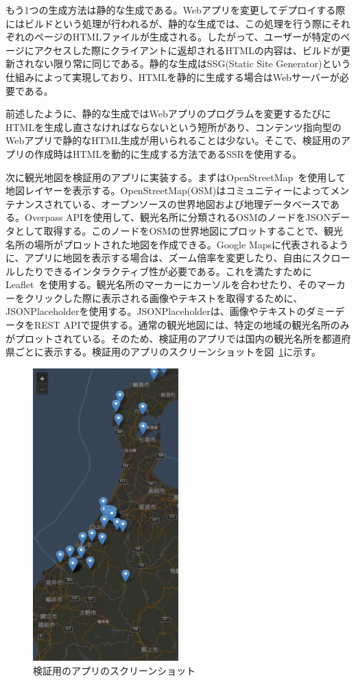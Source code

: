 もう1つの生成方法は静的な生成である。Webアプリを変更してデプロイする際にはビルドという処理が行われるが、静的な生成では、この処理を行う際にそれぞれのページのHTMLファイルが生成される。したがって、ユーザーが特定のページにアクセスした際にクライアントに返却されるHTMLの内容は、ビルドが更新されない限り常に同じである。静的な生成はSSG(Static Site Generator)という仕組みによって実現しており、HTMLを静的に生成する場合はWebサーバーが必要である。

前述したように、静的な生成ではWebアプリのプログラムを変更するたびにHTMLを生成し直さなければならないという短所があり、コンテンツ指向型のWebアプリで静的なHTML生成が用いられることは少ない。そこで、検証用のアプリの作成時はHTMLを動的に生成する方法であるSSRを使用する。

次に観光地図を検証用のアプリに実装する。まずはOpenStreetMap~\cite{OpenStreetMap}を使用して地図レイヤーを表示する。OpenStreetMap(OSM)はコミュニティーによってメンテナンスされている、オープンソースの世界地図および地理データベースである。Overpass APIを使用して、観光名所に分類されるOSMのノードをJSONデータとして取得する。このノードをOSMの世界地図にプロットすることで、観光名所の場所がプロットされた地図を作成できる。Google Mapsに代表されるように、アプリに地図を表示する場合は、ズーム倍率を変更したり、自由にスクロールしたりできるインタラクティブ性が必要である。これを満たすためにLeaflet~\cite{Leaflet}を使用する。観光名所のマーカーにカーソルを合わせたり、そのマーカーをクリックした際に表示される画像やテキストを取得するために、JSONPlaceholderを使用する。JSONPlaceholderは、画像やテキストのダミーデータをREST APIで提供する。通常の観光地図には、特定の地域の観光名所のみがプロットされている。そのため、検証用のアプリでは国内の観光名所を都道府県ごとに表示する。検証用のアプリのスクリーンショットを図~\ref{figure:検証用のアプリのスクリーンショット}に示す。
\begin{figure}
  \centering
  \includegraphics[width=0.5\textwidth]{paper/images/app_screenshot.png}
  \caption{検証用のアプリのスクリーンショット}
  \label{figure:検証用のアプリのスクリーンショット}
\end{figure}

